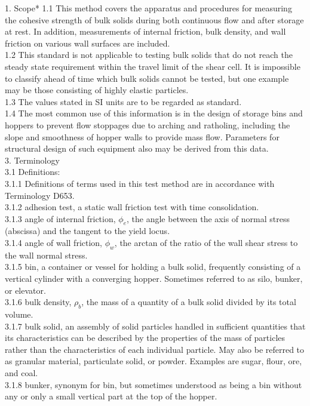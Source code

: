 1. Scope*
1.1 This method covers the apparatus and procedures for measuring the cohesive strength of bulk solids during both continuous flow and after storage at rest. In addition, measurements of internal friction, bulk density, and wall friction on various wall surfaces are included.\\
1.2 This standard is not applicable to testing bulk solids that do not reach the steady state requirement within the travel limit of the shear cell. It is impossible to classify ahead of time which bulk solids cannot be tested, but one example may be those consisting of highly elastic particles. \\
1.3 The values stated in SI units are to be regarded as standard.\\
1.4 The most common use of this information is in the design of storage bins and hoppers to prevent flow stoppages due to arching and ratholing, including the slope and smoothness of hopper walls to provide mass flow. Parameters for structural design of such equipment also may be derived from this data.\\
3. Terminology \\
3.1 Definitions: \\
3.1.1 Definitions of terms used in this test method are in accordance with Terminology D653. \\
3.1.2 adhesion test, a static wall friction test with time consolidation. \\
3.1.3 angle of internal friction, $\phi_e$, the angle between the axis of normal stress (abscissa) and the tangent to the yield locus. \\
3.1.4 angle of wall friction, $\phi_w$, the arctan of the ratio of the wall shear stress to the wall normal stress. \\
3.1.5 bin, a container or vessel for holding a bulk solid, frequently consisting of a vertical cylinder with a converging hopper. Sometimes referred to as silo, bunker, or elevator. \\
3.1.6 bulk density,  $\rho_b$, the mass of a quantity of a bulk solid divided by its total volume. \\
3.1.7 bulk solid, an assembly of solid particles handled in sufficient quantities that its characteristics can be described by the properties of the mass of particles rather than the characteristics of each individual particle. May also be referred to as granular material, particulate solid, or powder. Examples are sugar, flour, ore, and coal. \\
3.1.8 bunker, synonym for bin, but sometimes understood as being a bin without any or only a small vertical part at the top of the hopper. \\
